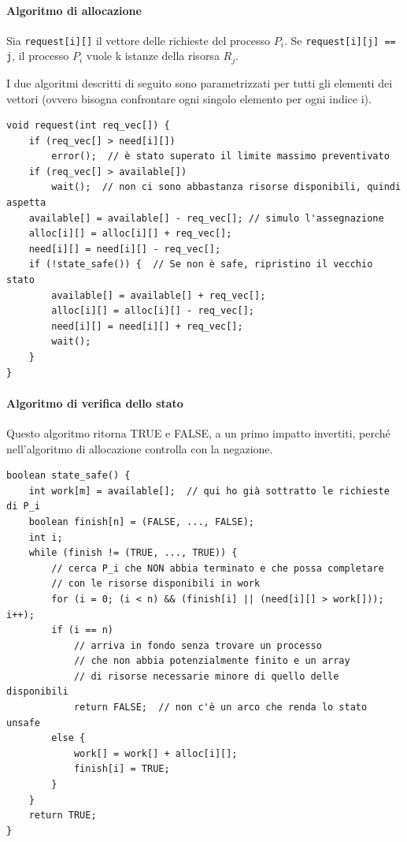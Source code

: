\documentclass[a4paper]{article}
\begin{document}
\paragraph{Algoritmo di allocazione}
Sia \verb|request[i][]| il vettore delle richieste del processo $P_i$. Se \verb|request[i][j] == j|, il processo $P_i$ vuole k istanze della risorsa $R_j$. 

I due algoritmi descritti di seguito sono parametrizzati per tutti gli elementi dei vettori (ovvero bisogna confrontare ogni singolo elemento per ogni indice i).
\begin{Verbatim}[tabsize=4]
void request(int req_vec[]) {
    if (req_vec[] > need[i][])
        error();  // è stato superato il limite massimo preventivato
    if (req_vec[] > available[])
        wait();  // non ci sono abbastanza risorse disponibili, quindi aspetta
    available[] = available[] - req_vec[]; // simulo l'assegnazione
    alloc[i][] = alloc[i][] + req_vec[];
    need[i][] = need[i][] - req_vec[];
    if (!state_safe()) {  // Se non è safe, ripristino il vecchio stato
        available[] = available[] + req_vec[];
        alloc[i][] = alloc[i][] - req_vec[];
        need[i][] = need[i][] + req_vec[];
        wait();
    }
}
\end{Verbatim}

\paragraph{Algoritmo di verifica dello stato}
Questo algoritmo ritorna TRUE e FALSE, a un primo impatto invertiti, perché nell'algoritmo di allocazione controlla con la negazione.

\begin{Verbatim}[tabsize=4]
boolean state_safe() {
    int work[m] = available[];  // qui ho già sottratto le richieste di P_i
    boolean finish[n] = (FALSE, ..., FALSE);
    int i;
    while (finish != (TRUE, ..., TRUE)) {
        // cerca P_i che NON abbia terminato e che possa completare
        // con le risorse disponibili in work
        for (i = 0; (i < n) && (finish[i] || (need[i][] > work[])); i++);
        if (i == n)  
            // arriva in fondo senza trovare un processo
            // che non abbia potenzialmente finito e un array
            // di risorse necessarie minore di quello delle disponibili
            return FALSE;  // non c'è un arco che renda lo stato unsafe
        else {
            work[] = work[] + alloc[i][];
            finish[i] = TRUE;
        }
    }
    return TRUE;
}
\end{Verbatim}
\end{document}
